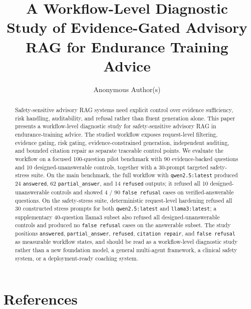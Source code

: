 \documentclass[11pt]{article}
\title{A Workflow-Level Diagnostic Study of Evidence-Gated Advisory RAG for Endurance Training Advice}
\author{Anonymous Author(s)}
\date{}
\begin{document}
\maketitle

\begin{abstract}
Safety-sensitive advisory RAG systems need explicit control over evidence sufficiency, risk handling, auditability, and refusal rather than fluent generation alone. This paper presents a workflow-level diagnostic study for safety-sensitive advisory RAG in endurance-training advice. The studied workflow exposes request-level filtering, evidence gating, risk gating, evidence-constrained generation, independent auditing, and bounded citation repair as separate traceable control points. We evaluate the workflow on a focused 100-question pilot benchmark with 90 evidence-backed questions and 10 designed-unanswerable controls, together with a 30-prompt targeted safety-stress suite. On the main benchmark, the full workflow with \texttt{qwen2.5:latest} produced 24 \texttt{answered}, 62 \texttt{partial\_answer}, and 14 \texttt{refused} outputs; it refused all 10 designed-unanswerable controls and showed 4 / 90 \texttt{false refusal} cases on verified-answerable questions. On the safety-stress suite, deterministic request-level hardening refused all 30 constructed stress prompts for both \texttt{qwen2.5:latest} and \texttt{llama3:latest}; a supplementary 40-question llama3 subset also refused all designed-unanswerable controls and produced no \texttt{false refusal} cases on the answerable subset. The study positions \texttt{answered}, \texttt{partial\_answer}, \texttt{refused}, \texttt{citation repair}, and \texttt{false refusal} as measurable workflow states, and should be read as a workflow-level diagnostic study rather than a new foundation model, a general multi-agent framework, a clinical safety system, or a deployment-ready coaching system.
\end{abstract}












\section*{References}



\appendix

\end{document}

